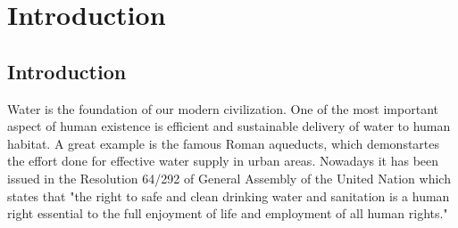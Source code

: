 \chapter{Introduction}
\label{Introduction}
  \singlespace
  \onehalfspace
  \acresetall

\section{Introduction}
\label{sec:introduction}
Water is the foundation of our modern civilization. One of the most important aspect of human existence is efficient and sustainable delivery of water to human habitat. A great example is the famous Roman aqueducts, which demonstartes the effort done for effective water supply in urban areas. Nowadays it has been issued in the Resolution 64/292 of General Assembly of the United Nation which states that "the right to safe and clean drinking water and sanitation is a human right essential to the full enjoyment of life and employment of all human rights." 
